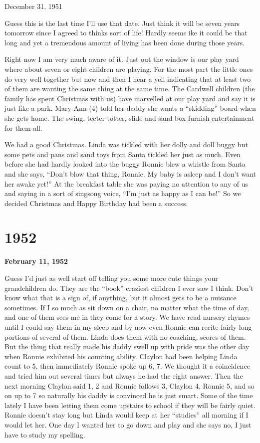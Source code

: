 \documentclass[]{book}
\begin{document}
December 31, 1951

Guess this is the last time I'll use that date. Just think it will be seven years tomorrow since I agreed to thinks sort of life! Hardly seems ike it could be that long and yet a tremendous amount of living has been done during those years.

Right now I am very much aware of it. Just out the window is our play yard where about seven or eight children are playing. For the most part the little ones do very well together but now and then I hear a yell indicating that at least two of them are wanting the same thing at the same time. The Cardwell children (the family has spent Christmas with us) have marvelled at our play yard and say it is just like a park. Mary Ann (4) told her daddy she wants a ``skidding'' board when she gets home. The swing, teeter-totter, slide and sand box furnish entertainment for them all.

We had a good Christmas. Linda was tickled with her dolly and doll buggy but some pets and pans and sand toys from Santa tickled her just as much. Even before she had hardly looked into the buggy Ronnie blew a whistle from Santa and she says, ``Don't blow that thing, Ronnie. My baby is asleep and I don't want her awake yet!'' At the breakfast table she was paying no attention to any of us and saying in a sort of singsong voice, ``I'm just as happy as I can be!'' So we decided Christmas and Happy Birthday had been a success.

\hypertarget{section-3}{%
\chapter{1952}\label{section-3}}

\textbf{February 11, 1952}

Guess I'd just as well start off telling you some more cute things your grandchildren do. They are the ``book'' craziest children I ever saw I think. Don't know what that is a sign of, if anything, but it almost gets to be a nuisance sometimes. If I so much as sit down on a chair, no matter what the time of day, and one of them sees me in they come for a story. We have read nursery rhymes until I could say them in my sleep and by now even Ronnie can recite fairly long portions of several of them. Linda does them with no coaching, scores of them. But the thing that really made his daddy swell up with pride was the other day when Ronnie exhibited his counting ability. Claylon had been helping Linda count to 5, then immediately Ronnie spoke up 6, 7. We thought it a coincidence and tried him out several times but always he had the right answer. Then the next morning Claylon said 1, 2 and Ronnie follows 3, Claylon 4, Ronnie 5, and so on up to 7 so naturally his daddy is convinced he is just smart. Some of the time lately I have been letting them come upstairs to school if they will be fairly quiet. Ronnie doesn't stay long but Linda would keep at her ``studies'' all morning if I would let her. One day I wanted her to go down and play and she says no, I just have to study my spelling.
\end{document}
